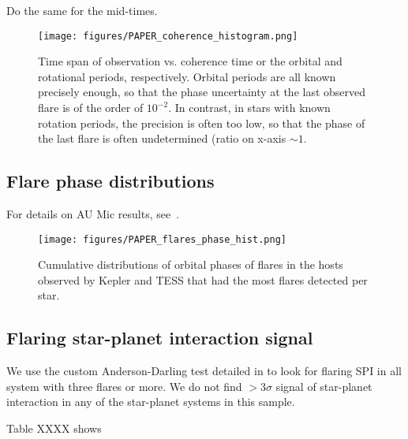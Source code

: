 \documentclass[twocolumn]{aastex631}
\begin{document}
Do the same for the mid-times.

\begin{figure}[ht!]
    \begin{centering}
        \texttt{[image: figures/PAPER\_coherence\_histogram.png]}
        \caption{
           Time span of observation vs. coherence time or the orbital and rotational periods, respectively. Orbital periods are all known precisely enough, so that the phase uncertainty at the last observed flare is of the order of $10^{-2}$. In contrast, in stars with known rotation periods, the precision is often too low, so that the phase of the last flare is often undetermined (ratio on x-axis $\sim 1$.
        }
        \label{fig:coherence_hist}
    \end{centering}
\end{figure}

\subsection{Flare phase distributions}

For details on AU Mic results, see~\citep{ilin2022searching}.

\begin{figure*}[ht!]
    \begin{centering}
        \texttt{[image: figures/PAPER\_flares\_phase\_hist.png]}
        \caption{
            Cumulative distributions of orbital phases of flares in the hosts observed by Kepler and TESS that had the most flares detected per star. 
        }
        \label{fig:cumdist_active}
    \end{centering}
\end{figure*}


\subsection{Flaring star-planet interaction signal}
We use the custom Anderson-Darling test detailed in \cite{ilin2022searching} to look for flaring SPI in all system with three flares or more. We do not find $>3\sigma$ signal of star-planet interaction in any of the star-planet systems in this sample.  

Table XXXX shows



\end{document}
